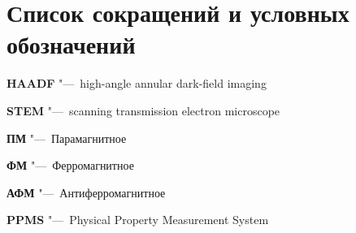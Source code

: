 \chapter*{Список сокращений и условных обозначений}             %



\textbf{HAADF} "---~high-angle annular dark-field imaging

\textbf{STEM} "---~scanning transmission electron microscope

\textbf{ПМ} "---~Парамагнитное

\textbf{ФМ} "---~Ферромагнитное

\textbf{АФМ} "---~Антиферромагнитное

\textbf{PPMS} "---~Physical Property Measurement System 

